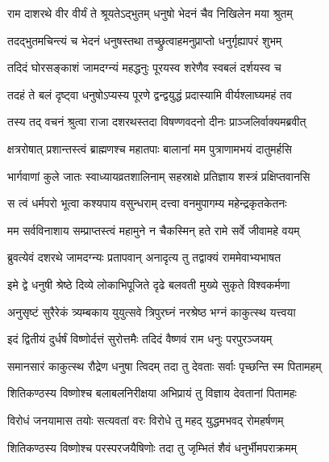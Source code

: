 
\twolineshloka
{राम दाशरथे वीर वीर्यं ते श्रूयतेऽद्भुतम्}
{धनुषो भेदनं चैव निखिलेन मया श्रुतम्} %

\twolineshloka
{तदद्भुतमचिन्त्यं च भेदनं धनुषस्तथा}
{तच्छ्रुत्वाहमनुप्राप्तो धनुर्गृह्यापरं शुभम्} %

\twolineshloka
{तदिदं घोरसङ्काशं जामदग्न्यं महद्धनुः}
{पूरयस्व शरेणैव स्वबलं दर्शयस्व च} %

\twolineshloka
{तदहं ते बलं दृष्ट्वा धनुषोऽप्यस्य पूरणे}
{द्वन्द्वयुद्धं प्रदास्यामि वीर्यश्लाघ्यमहं तव} %

\twolineshloka
{तस्य तद् वचनं श्रुत्वा राजा दशरथस्तदा}
{विषण्णवदनो दीनः प्राञ्जलिर्वाक्यमब्रवीत्} %

\twolineshloka
{क्षत्ररोषात् प्रशान्तस्त्वं ब्राह्मणश्च महातपाः}
{बालानां मम पुत्राणामभयं दातुमर्हसि} %

\twolineshloka
{भार्गवाणां कुले जातः स्वाध्यायव्रतशालिनाम्}
{सहस्राक्षे प्रतिज्ञाय शस्त्रं प्रक्षिप्तवानसि} %

\twolineshloka
{स त्वं धर्मपरो भूत्वा कश्यपाय वसुन्धराम्}
{दत्त्वा वनमुपागम्य महेन्द्रकृतकेतनः} %

\twolineshloka
{मम सर्वविनाशाय सम्प्राप्तस्त्वं महामुने}
{न चैकस्मिन् हते रामे सर्वे जीवामहे वयम्} %

\twolineshloka
{ब्रुवत्येवं दशरथे जामदग्न्यः प्रतापवान्}
{अनादृत्य तु तद्वाक्यं राममेवाभ्यभाषत} %

\twolineshloka
{इमे द्वे धनुषी श्रेष्ठे दिव्ये लोकाभिपूजिते}
{दृढे बलवती मुख्ये सुकृते विश्वकर्मणा} %

\twolineshloka
{अनुसृष्टं सुरैरेकं त्र्यम्बकाय युयुत्सवे}
{त्रिपुरघ्नं नरश्रेष्ठ भग्नं काकुत्स्थ यत्त्वया} %

\twolineshloka
{इदं द्वितीयं दुर्धर्षं विष्णोर्दत्तं सुरोत्तमैः}
{तदिदं वैष्णवं राम धनुः परपुरञ्जयम्} %

\twolineshloka
{समानसारं काकुत्स्थ रौद्रेण धनुषा त्विदम्}
{तदा तु देवताः सर्वाः पृच्छन्ति स्म पितामहम्} %

\twolineshloka
{शितिकण्ठस्य विष्णोश्च बलाबलनिरीक्षया}
{अभिप्रायं तु विज्ञाय देवतानां पितामहः} %

\twolineshloka
{विरोधं जनयामास तयोः सत्यवतां वरः}
{विरोधे तु महद् युद्धमभवद् रोमहर्षणम्} %

\twolineshloka
{शितिकण्ठस्य विष्णोश्च परस्परजयैषिणोः}
{तदा तु जृम्भितं शैवं धनुर्भीमपराक्रमम्} %

